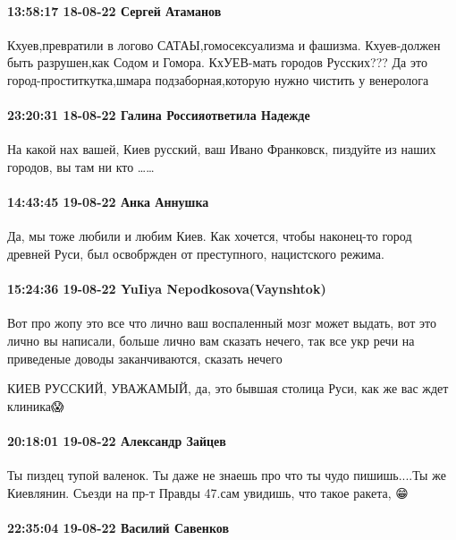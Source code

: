\paragraph{13:58:17 18-08-22 Сергей Атаманов}

Кхуев,превратили в логово САТАЫ,гомосексуализма и фашизма. Кхуев-должен быть
разрушен,как Содом и Гомора.  КхУЕВ-мать городов Русских??? Да это
город-проститкутка,шмара подзаборная,которую нужно чистить у венеролога

\paragraph{23:20:31 18-08-22 Галина Россияответила Надежде}

На какой нах вашей, Киев русский, ваш Ивано Франковск, пиздуйте из наших
городов, вы там ни кто ……

\paragraph{14:43:45 19-08-22 Анка Аннушка}

Да, мы тоже любили и любим Киев. Как хочется, чтобы наконец-то город древней
Руси, был освобржден от преступного, нацистского режима.

\paragraph{15:24:36 19-08-22 YuIiya Nepodkosova(Vaynshtok)}

Вот про жопу это все что лично ваш воспаленный мозг может выдать, вот это лично
вы написали, больше лично вам сказать нечего, так все укр речи на приведеные
доводы заканчиваются, сказать нечего

КИЕВ РУССКИЙ, УВАЖАМЫЙ, да, это бывшая столица Руси, как же вас ждет клиника😱

\paragraph{20:18:01 19-08-22 Александр Зайцев}

Ты пиздец тупой валенок. Ты даже не знаешь про что ты чудо пишишь....Ты же
Киевлянин. Съезди на пр-т Правды 47.сам увидишь, что такое ракета, 😁

\paragraph{22:35:04 19-08-22 Василий Савенков}

